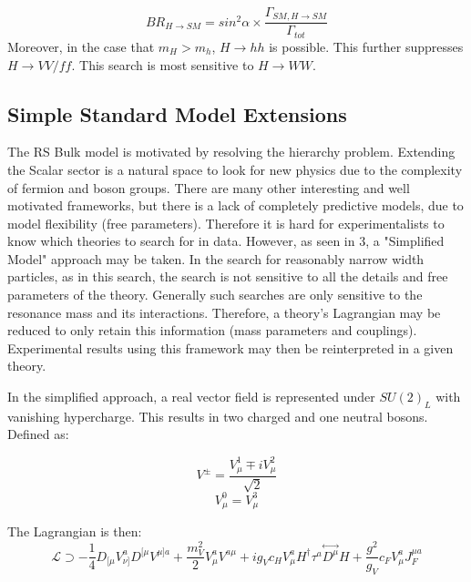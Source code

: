 \begin{equation}
BR_{H \rightarrow SM}=sin^{2}\alpha \times \frac{\Gamma_{SM, H \rightarrow SM}}{\Gamma_{tot}}
\end{equation}
Moreover, in the case that $m_{H} > m_{h}$, $H\rightarrow hh$ is possible. This further suppresses $H \rightarrow VV/ff$. This search is most sensitive to $H \rightarrow WW$.


\subsection{Simple Standard Model Extensions}
The RS Bulk model is motivated by resolving the hierarchy problem. Extending the Scalar sector is a natural space to look for new physics due to the complexity of fermion and boson groups. There are many other interesting and well motivated frameworks, but there is a lack of completely predictive models, due to model flexibility (free parameters). Therefore it is hard for experimentalists to know which theories to search for in data. However, as seen in 3\cite{hvt}, a "Simplified Model" approach may be taken. In the search for reasonably narrow width particles, as in this search, the search is not sensitive to all the details and free parameters of the theory. Generally such searches are only sensitive to the resonance mass and its interactions. Therefore, a theory's Lagrangian may be reduced to only retain this information (mass parameters and couplings). Experimental results using this framework may then be reinterpreted in a given theory. 

In the simplified approach, a real vector field is represented under $SU(2)_{L}$ with vanishing hypercharge. This results in two charged and one neutral bosons. Defined as:

\begin{equation}
V^{\pm}=\frac{V^{1}_{\mu}\mp iV^{2}_{\mu}}{\sqrt{2}}
\end{equation}
\begin{equation}
V^{0}_{\mu}=V^{3}_{\mu}
\end{equation}

The Lagrangian is then:
\begin{equation}
\mathcal{L}\supset -\frac{1}{4}D_{[\mu}V^{a}_{\nu]}D^{[\mu}V^{\mu]a} + \frac{m_{V}^{2}}{2}V^{a}_{\mu}V^{a\mu} + ig_{V}c_{H}V^{a}_{\mu}H^{\dag}\tau^{a}\overset\leftrightarrow{D^{\mu}}H+\frac{g^{2}}{g_{V}}c_{F}V^{a}_{\mu}J_{F}^{\mu a}
\end{equation}


